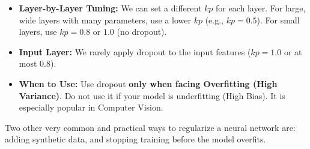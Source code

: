 \documentclass[10pt,a4paper]{article}
\begin{document}
\vspace{-2pt}

\par
\begin{itemize}[leftmargin=10pt, itemsep=0.5pt, topsep=0pt]
    \item \textbf{Layer-by-Layer Tuning:} We can set a different $kp$ for each layer. For large, wide layers with many parameters, use a lower $kp$ (e.g., $kp = 0.5$). For small layers, use $kp = 0.8$ or $1.0$ (no dropout).
    \item \textbf{Input Layer:} We rarely apply dropout to the input features ($kp = 1.0$ or at most $0.8$).
    \item \textbf{When to Use:} Use dropout \textbf{only when facing Overfitting (High Variance)}. Do not use it if your model is underfitting (High Bias). It is especially popular in Computer Vision.
\end{itemize}

\newpage


\par\vspace{1pt}
Two other very common and practical ways to regularize a neural network are: adding synthetic data, and stopping training before the model overfits.

\vspace{1pt}
\end{document}
